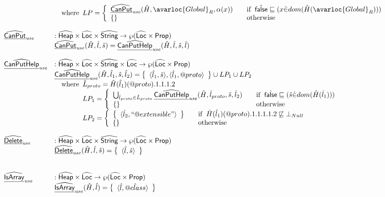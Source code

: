 \[\begin{array}{ll}
& \quad\wherec{
  LP=\left\{
    \begin{array}{ll}
      \ahf{CanPut}_{\it use}(\hat{H},\avarloc{Global}_R,\alpha(x))&\quad\ifc{\afalse\sqsubseteq(x \dot{\in} dom(\hat{H}(\avarloc{Global}_R)))}\\
      \set{} &\quad\owc
    \end{array}
  \right.
}
\\\\
\ahf{CanPut}_{\it use} & : \aHeap \times \aLoc \times \abs{String} \rightarrow \powerset{\aLoc \times \SF{Prop}}\\
& \ahf{CanPut}_{\it use}(\hat{H},\hat{l},\hat{s})
= \ahf{CanPutHelp}_{\it use}(\hat{H},\hat{l},\hat{s},\hat{l})
\\\\
\ahf{CanPutHelp}_{\it use} & : \aHeap \times \aLoc \times \abs{String} \times \aLoc \rightarrow \powerset{\aLoc \times \SF{Prop}}\\
& \ahf{CanPutHelp}_{\it use}(\hat{H},\hat{l}_1,\hat{s},\hat{l}_2)
= \set{\langle \hat{l}_1,\hat{s}\rangle, \langle \hat{l}_1,\varprop{proto}\rangle} \cup LP_1 \cup LP_2\\
&\quad\wherec{
  \hat{L}_{proto} = \hat{H}(\hat{l}_1)(\varprop{proto}).1.1.1.2\\
  LP_1 = \left\{
    \begin{array}{ll}
      \bigcup_{\hat{l}_{proto}\in\hat{L}_{proto}}\ahf{CanPutHelp}_{\it use}(\hat{H},\hat{l}_{proto},\hat{s},\hat{l}_2)& \quad\ifc{\afalse\sqsubseteq(\hat{s} \dot{\in} dom(\hat{H}(\hat{l}_1)))}\\
      \set{} &\quad\owc
    \end{array}
  \right.\\
  LP_2 = \left\{
    \begin{array}{ll}
      \set{\langle \hat{l}_2, ``@extensible" \rangle} & \quad\ifc{\hat{H}(\hat{l}_1)(\varprop{proto}).1.1.1.1.2 \not\sqsubseteq \bot_{Null}}\\
      \set{} &\quad\owc
    \end{array}
  \right.\\
}
\\\\
\ahf{Delete}_{\it use} & : \aHeap \times \aLoc \times \abs{String} \rightarrow \powerset{\aLoc \times \SF{Prop}}\\
& \ahf{Delete}_{\it use}(\hat{H},\hat{l},\hat{s}) = \set{\langle \hat{l},\hat{s}\rangle}\\
\\\\
\ahf{IsArray}_{\it use} & : \aHeap \times \aLoc \rightarrow \powerset{\aLoc \times \SF{Prop}}\\
& \ahf{IsArray}_{\it use}(\hat{H},\hat{l}) = \set{\langle \hat{l},\hat{\varprop{class}}\rangle}\\
\end{array}
\]
